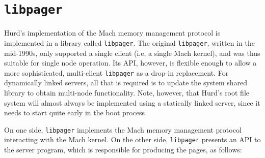 \documentclass{article}
\def\libpager{{\tt libpager}\xspace}
\begin{document}
\begin{comment}
For example, consider (again) what happens when node A drops its last
send right to a port on node B.  Node A sends a NO SENDERS message to
node B and forgets about the port.  It's possible that node B has sent
node A another send right for the same port, and that it's in transit
when node A sends the NO SENDERS message.  In that case, node A would
actually have an outstanding send right when node B receives the NO
SENDERS message, which would cause node B to incorrectly drop the send
right linked to node A.  I can see no way around this except a more
complicated handshake where the NO SENDERS message from node A to node
B would include a sequence number allowing node B to determine that it
hadn't sent any additional send rights, and a reply message from node
B to node A finalizing the port deallocation.  (what about SEQNOS?)
\end{comment}

\section{\libpager}

Hurd's implementation of the Mach memory management protocol is
implemented in a library called \libpager.  The original \libpager,
written in the mid-1990s, only supported a single client (i.e, a
single Mach kernel), and was thus suitable for single node operation.
Its API, however, is flexible enough to allow a more sophisticated,
multi-client \libpager as a drop-in replacement.  For dynamically
linked servers, all that is required is to update the system shared
library to obtain multi-node functionality.  Note, however, that
Hurd's root file system will almost always be implemented using a
statically linked server, since it needs to start quite early in
the boot process.

On one side, \libpager implements the Mach memory management protocol
interacting with the Mach kernel.  On the other side, \libpager
presents an API to the server program, which is responsible for
producing the pages, as follows:
\end{document}
